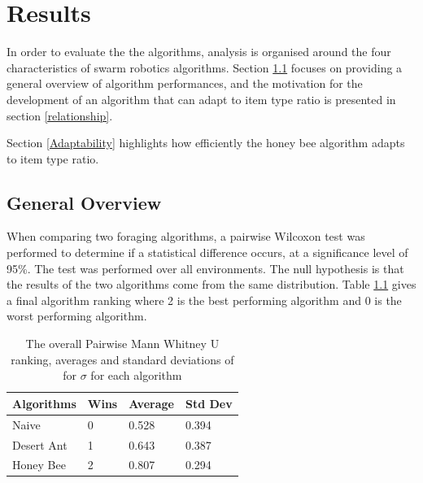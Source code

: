 \chapter{Results}
\label{chap:results}

In order to evaluate the the algorithms, analysis is organised around the four characteristics of swarm robotics algorithms. Section \ref{overview} focuses on providing a general overview of algorithm performances, and the motivation for the development of an algorithm that can adapt to item type ratio is presented in section \ref{relationship}. %

 Section \ref{Adaptability} highlights how efficiently the honey bee algorithm adapts to item type ratio. %

\section{General Overview}
\label{overview}
When comparing two foraging algorithms, a pairwise Wilcoxon test was performed to determine if a statistical difference occurs, at a significance level of 95\%. The test was performed over all environments. The null  hypothesis is that the results of the two algorithms come from the same distribution. Table \ref{summarytable} gives a final algorithm ranking where 2 is the best performing algorithm and 0 is the worst performing algorithm.

\begin{table}
\centering
    \caption{The overall Pairwise Mann Whitney U ranking, averages and standard deviations of for $\sigma$ for each algorithm}
        \label{summarytable}
    \begin{tabular}{l|lll}
    \hline \hline
    Algorithms & Wins & Average & Std Dev \\ \hline
    Naive      & 0    & 0.528   & 0.394  \\
    Desert Ant  & 1    & 0.643   & 0.387  \\
    Honey Bee   & 2    & 0.807   & 0.294  \\

    \hline
    \end{tabular}
\end{table}

